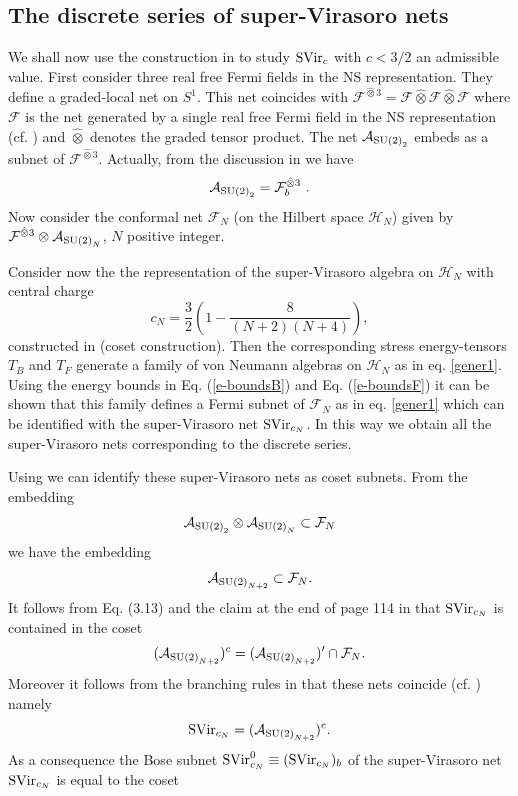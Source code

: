 \documentclass[11pt]{article}
\def\A{{\cal A}}
\def\H{{\cal H}}
\def\su2{{{\rm SU}(2)}}
\def\A{{\mathcal A}}
\def\F{{\mathcal F}}
\def\H{{\mathcal H}}
\begin{document}
\subsection{The discrete series of super-Virasoro nets}\label{SVirnet}
We shall now use the construction in \cite{GKO} to study ${\rm SVir}_{c}$ with $c < 3/2$ an admissible value.
First consider three real free Fermi fields in the NS representation. 
They define a graded-local net on $S^1$.  
This net coincides with $\F^{\hat{\otimes}3}=\F\hat{\otimes}\F\hat{\otimes}\F$ 
where $\F$ is the net generated by a single real free Fermi field in the NS representation 
(cf. \cite{Bock}) and $\hat{\otimes}$ denotes the graded tensor product. The net 
$\A_{\su2_2}$ embeds as a subnet of $\F^{\hat{\otimes}3}$. Actually, from the discussion in 
\cite[page 115]{GKO} we have
\[
\A_{\su2_2}=\F^{\hat{\otimes}3}_b\ .
\] 
Now consider the conformal net $\F_N$ (on the Hilbert space 
$\H_N$) given by $\F^{\hat{\otimes}3}\otimes \A_{\su2_N}$, $N$ positive integer.  

Consider now the the representation of the 
super-Virasoro algebra on $\H_N$ with central 
charge 
\begin{equation}
c_N=\frac{3}{2}\left(1-\frac{8}{(N+2)(N+4)}\right),
\end{equation} 
constructed in \cite[Sect. 3]{GKO} (coset construction). Then the corresponding 
stress energy-tensors $T_B$ and $T_F$ generate a family of von Neumann algebras on $\H_N$ 
as in eq. \eqref{gener1}. Using the energy bounds in Eq. (\ref{e-boundsB}) and Eq. 
(\ref{e-boundsF}) it can be shown that this family defines 
a Fermi subnet of $\F_N$ as in eq. \eqref{gener1} which can be identified with 
the super-Virasoro net ${\rm SVir}_{c_N}$.
In this way we obtain all the super-Virasoro nets corresponding to the discrete series.

 
Using \cite{GKO} we can identify these super-Virasoro nets as 
coset subnets. From the embedding  
\begin{equation}
\A_{\su2_2}\otimes \A_{\su2_N} \subset \F_N
\end{equation}
we have the embedding
\begin{equation}
\A_{\su2_{N+2}} \subset \F_N.
\end{equation}
It follows from Eq. (3.13) and the claim at the end of 
page 114 in \cite[Sect. 3]{GKO} that ${\rm SVir}_{c_N}$ is 
contained in the coset 
\begin{equation}
(\A_{\su2_{N+2}})^c = (\A_{\su2_{N+2}})'\cap \F_N.
\end{equation}
Moreover it follows from the branching rules in 
\cite[Eq. 4.15]{GKO} that these nets coincide (cf. \cite{KL1})
namely 
\begin{equation} 
{\rm SVir}_{c_N} = (\A_{\su2_{N+2}})^c. 
\end{equation}
As a consequence the Bose subnet ${\rm SVir}^0_{c_N}\equiv ({\rm SVir}_{c_N})_b$ of 
the super-Virasoro net ${\rm SVir}_{c_N}$ is equal to the coset
\end{document}

